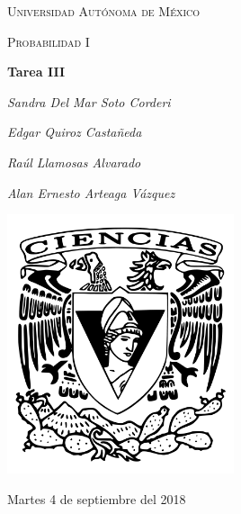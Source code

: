 \documentclass[12pt,a4paper]{report}
\begin{document}
\begin{titlepage}
	\centering
	{\scshape\LARGE Universidad Autónoma de México \par}
	\vspace{1cm}
	{\scshape\Large Probabilidad I\par}
	\vspace{1.5cm}
	{\huge\bfseries Tarea III\par}
	\vspace{.5cm}
	{\Large\itshape Sandra Del Mar Soto Corderi \par}
	\vspace{.5cm}
	{\Large\itshape Edgar Quiroz Castañeda \par}
    \vspace{.5cm}
	{\Large\itshape Raúl Llamosas Alvarado \par}
	 \vspace{.5cm}
	{\Large\itshape Alan Ernesto Arteaga Vázquez \par}
	\vfill
	 \includegraphics[width=0.5\textwidth]{escudo.png}
	\vfill

	{\large Martes 4 de septiembre del 2018 \par}
\end{titlepage}

\pagebreak
\setlength{\voffset}{-0.75in}
\setlength{\headsep}{5pt}
\end{document}
